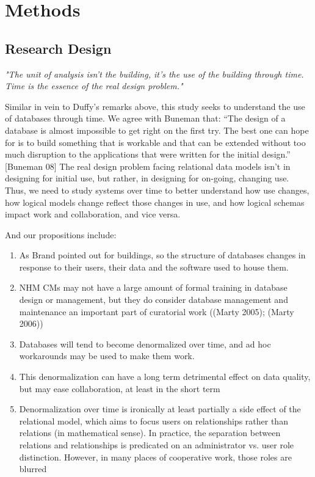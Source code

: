 \section{Methods}

\subsection{Research Design}
\textit{"The unit of analysis isn't the building, it's the use of the building through time. Time is the essence of the real design problem."}\cite{duffy1990measuring}

Similar in vein to Duffy's remarks above, this study seeks to understand the use of databases through time. We agree with Buneman that: “The design of a database is almost impossible to get right on the first try. The best one can hope for is to build something that is workable and that can be extended without too much disruption to the applications that were written for the initial design.” [Buneman 08] The real design problem facing relational data models isn't in designing for initial use, but rather, in designing for on-going, changing use.  Thus, we need to study systems over time to better understand how use changes, how logical models change reflect those changes in use, and how logical schemas impact work and collaboration, and vice versa.

And our propositions include:
\begin{enumerate}
\item As Brand pointed out for buildings, so the structure of databases changes in response to their users, their data and the software used to house them.
\item NHM CMs may not have a large amount of formal training in database design or management, but they do consider database management and maintenance an important part of curatorial work ((Marty 2005); (Marty 2006))
\item Databases will tend to become denormalized over time, and ad hoc workarounds may be used to make them work.
\item This denormalization can have a long term detrimental effect on data quality, but may ease collaboration, at least in the short term
\item Denormalization over time is ironically at least partially a side effect of the relational model, which aims to focus users on relationships rather than relations (in mathematical sense). In practice, the separation between relations and relationships is predicated on an administrator vs. user role distinction. However, in many places of cooperative work, those roles are blurred
\end{enumerate}

